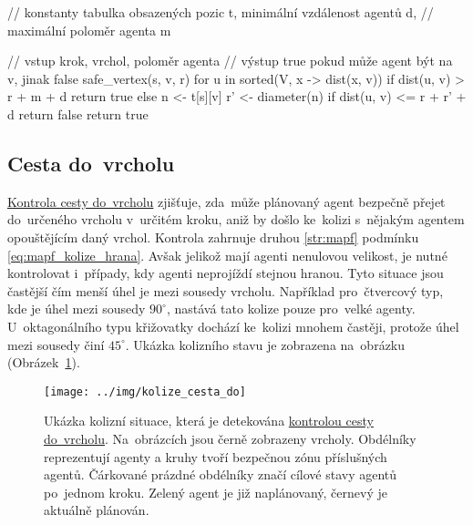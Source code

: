 \begin{code}[fontsize=\footnotesize]
// konstanty tabulka obsazených pozic t, minimální vzdálenost agentů d,
// maximální poloměr agenta m

// vstup krok, vrchol, poloměr agenta
// výstup true pokud může agent být na v, jinak false
safe_vertex(s, v, r)
  for u in sorted(V, x -> dist(x, v))
    if dist(u, v) > r + m + d
      return true
    else
      n <- t[s][v]
      r' <- diameter(n)
      if dist(u, v) <= r + r' + d
        return false
return true
\end{code}

\subsection{Cesta do~vrcholu}\label{subsec:cesta_do_vrcholu}


\hyperref[subsec:cesta_do_vrcholu]{Kontrola cesty do~vrcholu} zjišťuje,
zda~může plánovaný agent bezpečně přejet do~určeného vrcholu v~určitém kroku,
aniž by došlo ke~kolizi s~nějakým agentem opouštějícím daný vrchol.
Kontrola zahrnuje druhou \ref{str:mapf} podmínku
 \eqref{eq:mapf_kolize_hrana}.
Avšak jelikož mají agenti nenulovou velikost, je nutné kontrolovat i~případy, kdy agenti neprojíždí stejnou hranou.
Tyto situace jsou častější čím menší úhel je mezi sousedy vrcholu.
Například pro~čtvercový typ, kde je úhel mezi sousedy $90^\circ$, nastává tato kolize pouze pro~velké agenty.
U~oktagonálního typu křižovatky dochází ke~kolizi mnohem častěji, protože úhel mezi sousedy činí $45^\circ$.
Ukázka kolizního stavu je zobrazena na~obrázku (Obrázek~\ref{fig:kolize_cesta_do}).

\begin{figure}[h]
	\centering
	\texttt{[image: ../img/kolize\_cesta\_do]}
	\caption{
		Ukázka kolizní situace, která je detekována \hyperref[subsec:cesta_do_vrcholu]{kontrolou cesty do~vrcholu}.
		Na~obrázcích jsou černě zobrazeny vrcholy.
		Obdélníky reprezentují agenty a kruhy tvoří bezpečnou zónu příslušných agentů.
		Čárkované prázdné obdélníky značí cílové stavy agentů po~jednom kroku.
		Zelený agent je již naplánovaný, černevý je aktuálně plánován.
	}
	\label{fig:kolize_cesta_do}
\end{figure}



